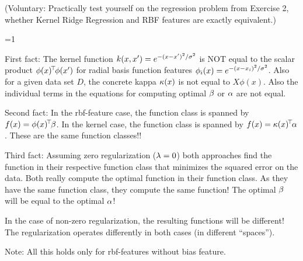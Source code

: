 (Voluntary: Practically test yourself on the regression problem from Exercise 2, whether Kernel Ridge Regression and RBF features are exactly equivalent.)





\ifnum\value{solutions}=1
\begin{solution}
First fact: The kernel function $k(x,x') = e^{-(x-x')^2/\sigma^2}$ is
NOT equal to the scalar product $\phi(x)^{\!\top\!} \phi(x')$ for radial basis
function features $\phi_i(x) = e^{-(x-x_i)^2/\sigma^2}$. Also for a given
data set $D$, the concrete kappa $\kappa(x)$ is not equal to
$X \phi(x)$. Also the individual terms in the equations for computing
optimal $\beta$ or $\alpha$ are not equal.

Second fact: In the rbf-feature case, the function class is spanned by
$f(x) = \phi(x)^{\!\top\!} \beta$. In the kernel case, the function class is
spanned by $f(x) = \kappa(x)^{\!\top\!} \alpha$. These are the same function classes!!

Third fact: Assuming zero regularization ($\lambda=0$) both approaches find
the function in their respective function class that minimizes the
squared error on the data. Both really compute the optimal function in
their function class. As they have the same function class, they
compute the same function! The optimal $\beta$ will be equal to the
optimal $\alpha$!

In the case of non-zero regularization, the resulting functions will
be different! The regularization operates differently in both cases
(in different ``spaces'').

Note: All this holds only for rbf-features without bias feature.
\end{solution}
\fi

